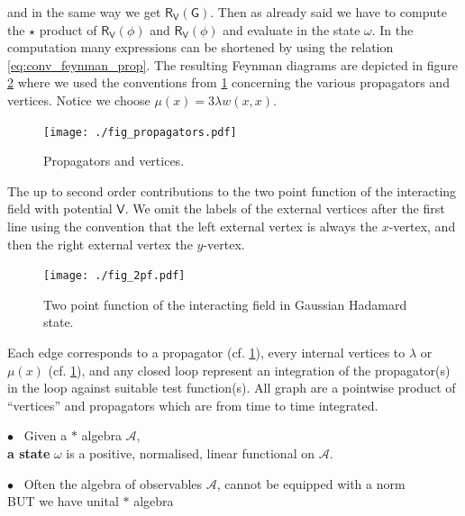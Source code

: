 \documentclass[11pt]{book}
\newcommand{\Acal}{\mathcal{A}}
\newcommand{\Gsf}{\mathsf{G}}
\newcommand{\Rsf}{\mathsf{R}}
\newcommand{\Vsf}{\mathsf{V}}
\theoremstyle{break}
\begin{document}
%
and in the same way we get $\Rsf_\Vsf(\Gsf)$. Then as already said we have to compute the $\star$ product of $\Rsf_\Vsf(\phi)$ and $\Rsf_\Vsf(\phi)$ and evaluate in the state $\omega$. In the computation many expressions can be shortened by using the relation \eqref{eq:conv_feynman_prop}. The resulting Feynman diagrams are depicted in figure \ref{fig:2pf} where we used the conventions from \ref{fig:prop_vertices} concerning the various propagators and vertices. Notice we choose $\mu(x)=3\lambda w(x,x)$.


\begin{figure}[ht]
\centering
\texttt{[image: ./fig\_propagators.pdf]}
\caption{Propagators and vertices.}
\label{fig:prop_vertices}
\end{figure}


The up to second order contributions to the two point function of the interacting field with potential $\Vsf$. We omit the labels of the external vertices after the first line using the convention that the left external vertex is always the $x$-vertex, and then the right external vertex the $y$-vertex.


\begin{figure}[ht!]
\centering
\texttt{[image: ./fig\_2pf.pdf]}
\caption{Two point function of the interacting field in Gaussian Hadamard state.}
\label{fig:2pf}
\end{figure}


Each edge corresponds to a propagator (cf. \ref{fig:prop_vertices}), every internal vertices to $\lambda$ or $\mu(x)$ (cf. \ref{fig:prop_vertices}), and any closed loop represent an integration of the propagator(s) in the loop against suitable test function(s). All graph are a pointwise product of ``vertices'' and propagators which are from time to time integrated.

\vspace*{80pt}


$\bullet$ \ Given a $\ast$ algebra $\Acal$, \\
\hspace*{8pt} \textbf{a state} $\omega$ is a positive, normalised, linear functional on $\Acal$. \\

\bigskip
  
$\bullet$ \ Often the algebra of observables $\Acal$, cannot be equipped with a norm \\
\hspace*{8pt} BUT we have unital $\ast$ algebra \\
\end{document}
